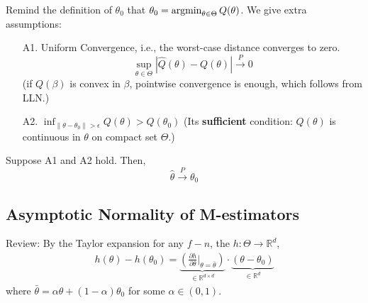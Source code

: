 \documentclass[11pt]{elegantbook}
\newcommand{\argmin}{\operatornamewithlimits{argmin}}
\begin{document}
\begin{theorem}
    Remind the definition of $\theta_0$ that $\theta_0=\argmin_{\theta\in\Theta} Q(\theta)$. We give extra assumptions:
    \begin{enumerate}
        \item[A1.] Uniform Convergence, i.e., the worst-case distance converges to zero. $$\sup_{\theta\in\Theta}|\hat{Q}(\theta)-Q(\theta)| \stackrel{P}{\longrightarrow} 0$$
        (if $Q(\beta)$ is convex in $\beta$, pointwise convergence is enough, which follows from LLN.)
        \item[A2.] $\inf_{\|\theta-\theta_0\|>\epsilon}Q(\theta)> Q(\theta_0)$ (Its \textbf{sufficient} condition: $Q(\theta)$ is continuous in $\theta$ on compact set $\Theta$.)
    \end{enumerate}
    Suppose A1 and A2 hold. Then, $$\hat{\theta} \stackrel{P}{\longrightarrow} \theta_0$$
\end{theorem}

\subsection{Asymptotic Normality of M-estimators}
Review: By the Taylor expansion for any $f-n$, the $h: \Theta \rightarrow \mathbb{R}^d$,
\begin{equation}
    \begin{aligned}
        h(\theta)-h(\theta_0)=\underbrace{\left(\frac{\partial h}{\partial \theta}\big|_{\theta=\bar{\theta}}\right)}_{\in \mathbb{R}^{d\times d}}\cdot\underbrace{(\theta-\theta_0)}_{\in \mathbb{R}^d}
    \end{aligned}
    \nonumber
\end{equation}
where $\bar{\theta}=\alpha\theta+(1-\alpha)\theta_0$ for some $\alpha\in (0,1)$.
\end{document}
